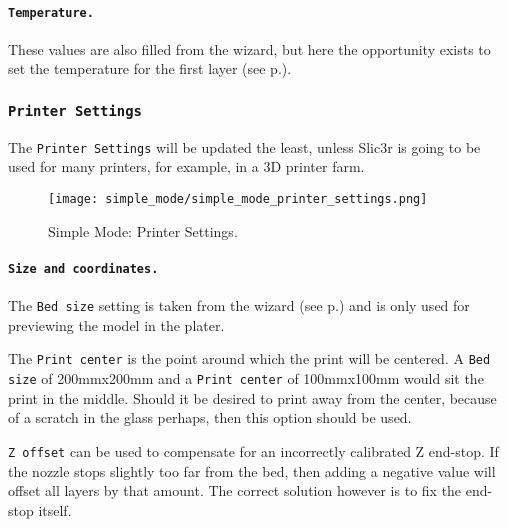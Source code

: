 \paragraph{\texttt{Temperature.}} %
\label{par:temperature}
These values are also filled from the wizard, but here the opportunity exists to set the temperature for the first layer (see p.\pageref{sec:the_important_first_layer}).


\subsubsection{\texttt{Printer Settings}}

The \texttt{Printer Settings} will be updated the least, unless Slic3r is going to be used for many printers, for example, in a 3D printer farm.

\begin{figure}[H]
\centering
\texttt{[image: simple\_mode/simple\_mode\_printer\_settings.png]}
\caption{Simple Mode: Printer Settings.}
\label{fig:simple_mode_printer_settings}
\end{figure}

\paragraph{\texttt{Size and coordinates.}} %
\label{par:size_and_coordinates}
The \texttt{Bed size} setting is taken from the wizard (see p.\pageref{sub:2_bed_size}) and is only used for previewing the model in the plater.

The \texttt{Print center} is the point around which the print will be centered.  A \texttt{Bed size} of 200mmx200mm and a \texttt{Print center} of 100mmx100mm would sit the print in the middle.  Should it be desired to print away from the center, because of a scratch in the glass perhaps, then this option should be used.

\texttt{Z offset} can be used to compensate for an incorrectly calibrated Z end-stop.  If the nozzle stops slightly too far from the bed, then adding a negative value will offset all layers by that amount.  The correct solution however is to fix the end-stop itself.

